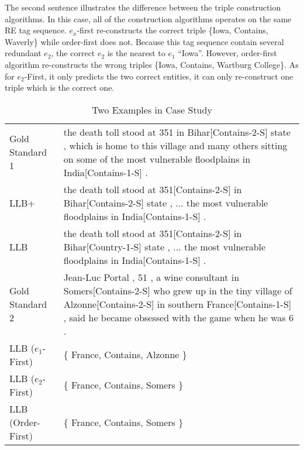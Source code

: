 The second sentence illustrates the difference between the triple construction
algorithms. In this case, all of the construction algorithms operates on the
same RE tag sequence. $e_x$-first re-constructs the correct triple \{Iowa,
Contains, Waverly\} while order-first does not. Because this tag sequence contain
several redundant $e_2$, the correct $e_2$ is the nearest to $e_1$ ``Iowa''.
However, order-first algorithm re-constructs the wrong triples \{Iowa,
Contains, Wartburg College\}. As for $e_2$-First, it only
predicts the two correct entities, it can only re-construct one triple which is
the correct one. 

\begin{table*}[th!]
  \small
  \begin{center}
  \caption{Two Examples in Case Study}
  \label{tab:case}
    \begin{tabular}{lp{12cm}}
      \hline
      Gold Standard 1& the death toll stood at 351 in Bihar[Contains-2-S] state , which is home to this village and many others sitting on some of the most vulnerable floodplains in India[Contains-1-S] . \\
      LLB+ & the death toll stood at 351[Contains-2-S] in Bihar[Contains-2-S] state , ... the most vulnerable floodplains in India[Contains-1-S] . \\
      LLB & the death toll stood at 351[Contains-2-S] in Bihar[Country-1-S] state , ...  the most vulnerable floodplains in India[Contains-1-S] . \\
      \hline
      Gold Standard 2 & Jean-Luc Portal , 51 , a wine consultant in Somers[Contains-2-S] who grew up in the tiny village of Alzonne[Contains-2-S] in southern France[Contains-1-S] , said he became obsessed with the game when he was 6 . \\
      LLB ($e_1$-First) & \{ France, Contains, Alzonne \} \\
      LLB ($e_2$-First) & \{ France, Contains, Somers \} \\
      LLB (Order-First) & \{ France, Contains, Somers \} \\
      \hline
    \end{tabular}
  \end{center}
\end{table*}




